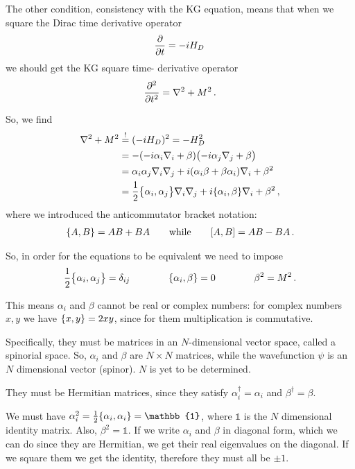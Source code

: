 \documentclass[main.tex]{subfiles}
\begin{document}
The other condition, consistency with the KG equation, means that when we square the Dirac time derivative operator 
%
\begin{align}
\pdv{}{t} = -i H_D
\,
\end{align}
%
we should get the KG square time- derivative operator 
%
\begin{align}
\pdv[2]{}{t} = \nabla^2 + M^2
\,.
\end{align}

So, we find 
%
\begin{subequations}
\begin{align}
\nabla^2 + M^2 &\overset{!}{=} (-i H_D)^2 = - H_D^2  \\
&= -\qty(-i \alpha_{i}  \nabla_{i} + \beta ) \qty(-i \alpha_{j} \nabla_{j} + \beta )  \\
&= \alpha_{i} \alpha_{j} \nabla_{i} \nabla_{j} + i \qty(\alpha_{i} \beta  + \beta \alpha_{i}) \nabla_{i} + \beta^2  \\
&= \frac{1}{2} \qty{\alpha_{i}, \alpha_{j}} \nabla_{i} \nabla_{j} 
+ i \qty{\alpha_{i}, \beta } \nabla_{i} + \beta^2
\,,
\end{align}
\end{subequations}
%
where we introduced the anticommutator bracket notation: 
%
\begin{align}
\qty{A, B} = AB + BA
\qquad \text{while} \qquad
\qty[A, B] = AB - BA
\,.
\end{align}

So, in order for the equations to be equivalent we need to impose 
%
\begin{align}
\frac{1}{2}\qty{\alpha_{i}, \alpha_{j}} = \delta_{ij}
\qquad \qquad 
\qty{\alpha_{i}, \beta } = 0
\qquad \qquad 
\beta^2 = M^2
\,.
\end{align}

This means \(\alpha_{i}\) and \(\beta \) cannot be real or complex numbers: for complex numbers \(x, y\) we have \(\qty{x, y} = 2 xy \),  since for them multiplication is commutative. 

Specifically, they must be matrices in an \(N\)-dimensional vector space, called a spinorial space. 
So, \(\alpha_{i}\) and \(\beta \) are \(N \times N\) matrices, while the wavefunction \(\psi \) is an \(N\) dimensional vector (spinor). \(N\) is yet to be determined.

They must be Hermitian matrices, since they satisfy \(\alpha_{i} ^\dag = \alpha_{i}\) and \(\beta ^\dag = \beta \).

We must have \(\alpha_{i}^2 = \frac{1}{2} \qty{\alpha_{i}, \alpha_{i}} = \mathbb{1}\), where \(\mathbb{1}\) is the \(N\) dimensional identity matrix. Also, \(\beta^2 = \mathbb{1}\). 
If we write \(\alpha_{i}\) and \(\beta \) in diagonal form, which we can do since they are Hermitian, we get their real eigenvalues on the diagonal. If we square them we get the identity, therefore they must all be \(\pm 1\). 
\end{document}
